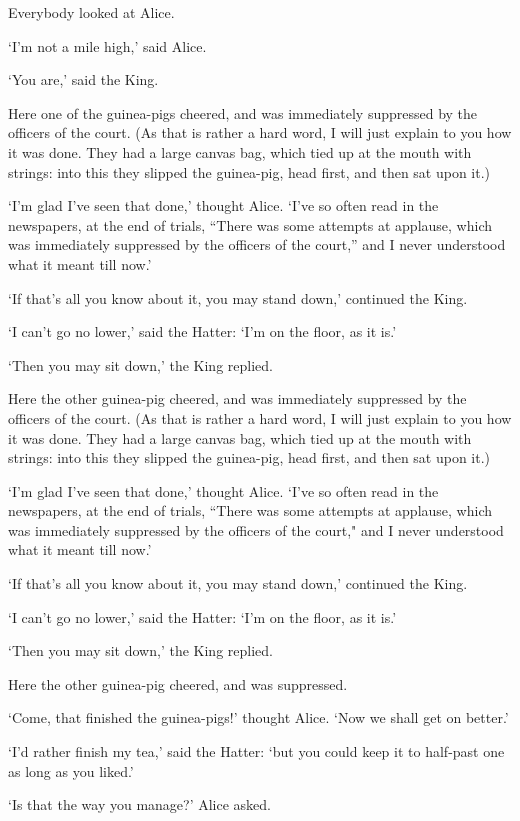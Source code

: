 \documentclass[statementpaper,twoside,openany]{memoir}
\begin{document}
Everybody looked at Alice.

`I'm not a mile high,' said Alice.

`You are,' said the King.

Here one of the guinea-pigs cheered, and was immediately suppressed by the officers of the court. (As that is rather a hard word, I will just explain to you how it was done. They had a large canvas bag, which tied up at the mouth with strings: into this they slipped the guinea-pig, head first, and then sat upon it.)

`I'm glad I've seen that done,' thought Alice. `I've so often read in the newspapers, at the end of trials, ``There was some attempts at applause, which was immediately suppressed by the officers of the court,'' and I never understood what it meant till now.'

`If that's all you know about it, you may stand down,' continued the King.

`I can't go no lower,' said the Hatter: `I'm on the floor, as it is.'

`Then you may sit down,' the King replied.

Here the other guinea-pig cheered, and was immediately suppressed by the officers of the court. (As that is rather a hard word, I will just explain to you how it was done. They had a large canvas bag, which tied up at the mouth with strings: into this they slipped the guinea-pig, head first, and then sat upon it.)

`I'm glad I've seen that done,' thought Alice. `I've so often read in the newspapers, at the end of trials, ``There was some attempts at applause, which was immediately suppressed by the officers of the court," and I never understood what it meant till now.'

`If that's all you know about it, you may stand down,' continued the King.

`I can't go no lower,' said the Hatter: `I'm on the floor, as it is.'

`Then you may sit down,' the King replied.

Here the other guinea-pig cheered, and was suppressed.

`Come, that finished the guinea-pigs!' thought Alice. `Now we shall get on better.'

`I'd rather finish my tea,' said the Hatter: `but you could keep it to half-past one as long as you liked.'

`Is that the way you manage?' Alice asked.
\end{document}
